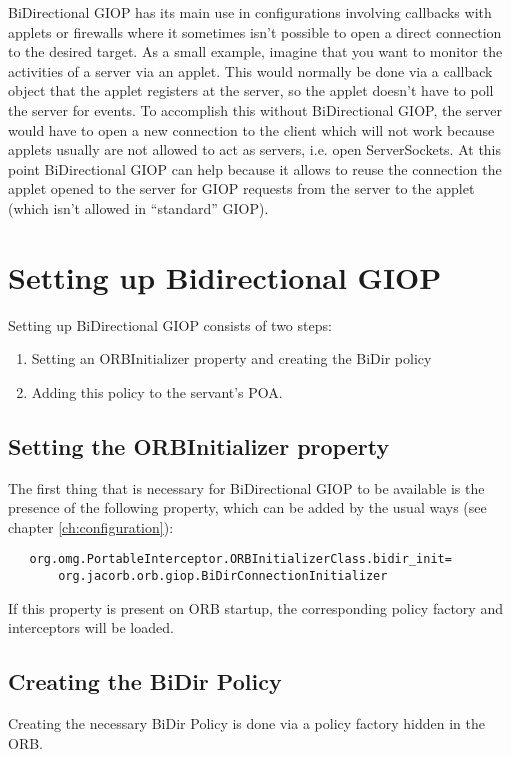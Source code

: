 
BiDirectional GIOP has its main use in configurations involving callbacks with
applets or firewalls where it sometimes isn't possible to open a direct
connection to the desired target. As a small example, imagine that you want to
monitor the activities of a server via an applet. This would normally be done
via a callback object that the applet registers at the server, so the applet
doesn't have to poll the server for events. To accomplish this without
BiDirectional GIOP, the server would have to open a new connection to the
client which will not work because applets usually are not allowed to act as
servers, i.e. open ServerSockets. At this point BiDirectional GIOP can help
because it allows to reuse the connection the applet opened to the server for
GIOP requests from the server to the applet (which isn't allowed in
``standard'' GIOP).

\section{Setting up Bidirectional GIOP}

Setting up BiDirectional GIOP consists of two steps:
\begin{enumerate}
\item Setting an ORBInitializer property and  creating the BiDir policy
\item Adding this policy to the servant's POA.
\end{enumerate}

\subsection{Setting the ORBInitializer property}
\label{sec:setting-up-bidir-orbinitializer}

The first thing that is necessary for BiDirectional GIOP to be available is
the presence of the following property, which can be added by the usual ways
(see chapter \ref{ch:configuration}):

\begin{verbatim}
   org.omg.PortableInterceptor.ORBInitializerClass.bidir_init=
       org.jacorb.orb.giop.BiDirConnectionInitializer
\end{verbatim}

If this property is present on ORB startup, the corresponding policy factory
and interceptors will be loaded.


\subsection{Creating the BiDir Policy}
Creating the necessary BiDir Policy is done via a policy factory hidden in the
ORB.


